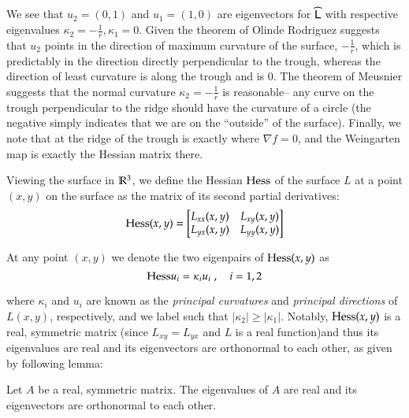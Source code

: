   We see that $u_2 = (0,1)$ and $u_1 = (1,0)$ are eigenvectors for $\widehat{\mathsf{L}}$ with respective eigenvalues
  $\kappa_2 = -\frac{1}{r} , \kappa_1 = 0$. Given the theorem of Olinde Rodriguez suggests that $u_2$ points in the direction of maximum curvature of the surface, $-\frac{1}{r}$, which is predictably in the direction directly perpendicular to the trough, whereas the direction of least curvature is along the trough and is $0$. The theorem of Meusnier suggests that the normal curvature $\kappa_2 = -\frac{1}{r}$ is reasonable-- any curve on the trough perpendicular to the ridge should have the curvature of a circle (the negative simply indicates that we are on the ``outside'' of the surface). Finally, we note that at the ridge of the trough is exactly where $\nabla f = 0$, and the Weingarten map is exactly the Hessian matrix there.
  
  Viewing the surface in $\mathbb{R}^3$, we define the Hessian  $\mathrm{Hess}$ of the surface $L$
  at a point $(x,y)$ on the surface as the matrix of its second partial derivatives:
  \begin{equation}
  \mathrm{Hess}(x,y) = \begin{bmatrix}
  L_{xx}(x,y) & L_{xy}(x,y) \\
  L_{yx}(x,y) & L_{yy}(x,y)
  \end{bmatrix}
  \end{equation}
  
  At any point $(x,y)$ we denote the two eigenpairs of $\mathrm{Hess}(x,y)$ as
  \begin{equation}
  \mathrm{Hess} u_i = \kappa_i u_i \; , \quad i = 1,2
  \end{equation}
  
  where $\kappa_i$ and $u_i$ are known as the
  \textit{principal curvatures} and \textit{principal directions}  of $L(x,y)$, respectively, and we label such that $|\kappa_2| \ge |\kappa_1|$. Notably, $\mathrm{Hess}(x,y)$ is a real, symmetric matrix (since  $L_{xy} = L_{yx}$ and $L$ is a real function)and thus its eigenvalues are real and its eigenvectors are orthonormal to each other, as given by following lemma:
  
  \begin{lemma}
     	Let $A$ be a real, symmetric matrix. The eigenvalues of $A$ are real and its eigenvectors are orthonormal to each other.
  \end{lemma}
  
